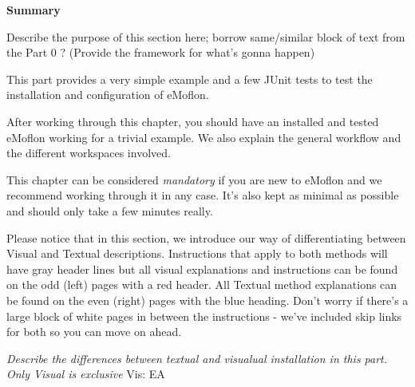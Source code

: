 \vspace*{2cm}

{\Huge \bfseries Summary}
\vspace{1cm}

Describe the purpose of this section here; borrow same/similar block of text from the Part 0 ?
(Provide the framework for what's gonna happen)

This part provides a very simple example and a few JUnit tests to test the installation and configuration of eMoflon.

After working through this chapter, you should have an installed and tested eMoflon working for a trivial example.
We also explain the general workflow and the different workspaces involved.

This chapter can be considered \emph{mandatory} if you are new to eMoflon and we recommend working through it in any case.
It's also kept as minimal as possible and should only take a few minutes really.

Please notice that in this section, we introduce our way of differentiating between Visual and Textual descriptions.
Instructions that apply to both methods will have gray header lines but all visual
explanations and instructions can be found on the odd (left) pages with a red header. All Textual method explanations can be
found on the even (right) pages with the blue heading. Don't worry if there's a large block of white pages in between the
instructions - we've included skip links for both so you can move on ahead.

\large{\emph{Describe the differences between textual and visualual installation in this part. Only Visual is exclusive}}
Vis: EA

